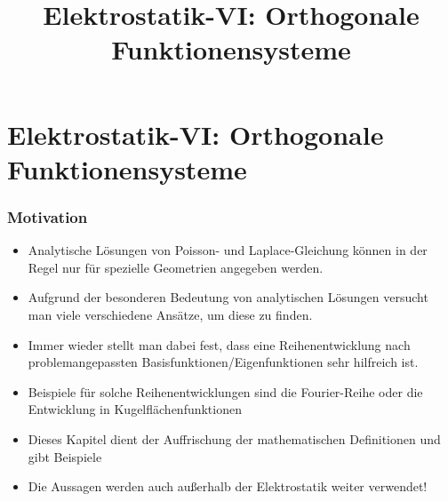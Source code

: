 

\title[TET: Elektrostatik-VI: Orthogonale Funktionensysteme]{Elektrostatik-VI: Orthogonale Funktionensysteme}


% 
% 

\maketitle

% 
% 
\section{Elektrostatik-VI: Orthogonale Funktionensysteme}

\begin{frame}

  \frametitle{Motivation}
  \begin{itemize}[<+->]
  \item Analytische Lösungen von Poisson- und Laplace-Gleichung können in der Regel nur für \alert{spezielle Geometrien} angegeben werden.
  \item Aufgrund der besonderen Bedeutung von analytischen Lösungen versucht man viele verschiedene Ansätze, um diese zu finden.
  \item Immer wieder stellt man dabei fest, dass eine \alert{Reihenentwicklung} nach problemangepassten \alert{Basisfunktionen/Eigenfunktionen} sehr hilfreich ist.
  \item Beispiele für solche Reihenentwicklungen sind die \alert{Fourier-Reihe} oder die Entwicklung in \alert{Kugelflächenfunktionen}
  \item Dieses Kapitel dient der Auffrischung der mathematischen Definitionen und gibt Beispiele
    \item Die Aussagen werden auch \alert{außerhalb der Elektrostatik} weiter verwendet!
    \end{itemize}
  
  \end{frame}

